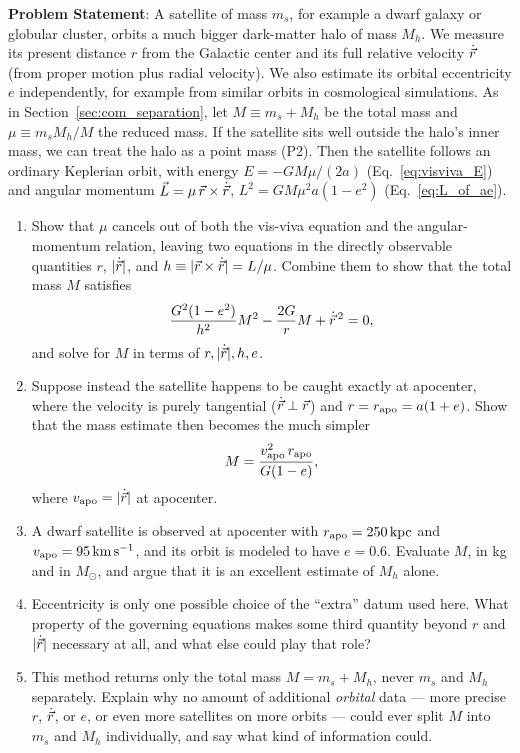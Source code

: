 \textbf{Problem Statement}: A satellite of mass $m_s$, for example a dwarf galaxy or globular cluster, orbits a much bigger dark-matter halo of mass $M_h$. We measure its present distance $r$ from the Galactic center and its full relative velocity $\dot{\vec r}$ (from proper motion plus radial velocity). We also estimate its orbital eccentricity $e$ independently, for example from similar orbits in cosmological simulations. As in Section~\ref{sec:com_separation}, let $M\equiv m_s+M_h$ be the total mass and $\mu\equiv m_sM_h/M$ the reduced mass. If the satellite sits well outside the halo's inner mass, we can treat the halo as a point mass (P2). Then the satellite follows an ordinary Keplerian orbit, with energy $E=-GM\mu/(2a)$ (Eq.~\eqref{eq:visviva_E}) and angular momentum $\vec L=\mu\,\vec r\times\dot{\vec r}$, $L^2=GM\mu^2a(1-e^2)$ (Eq.~\eqref{eq:L_of_ae}).
\begin{enumerate}[label=(\alph*)]
	\item Show that $\mu$ cancels out of both the vis-viva equation and the angular-momentum relation, leaving two equations in the directly observable quantities $r$, $|\dot{\vec r}|$, and $h\equiv|\vec r\times\dot{\vec r}|=L/\mu$. Combine them to show that the total mass $M$ satisfies
	\[
	\frac{G^2(1-e^2)}{h^2}M^2-\frac{2G}{r}M+\dot{\vec r}^{\,2}=0,
	\]
	and solve for $M$ in terms of $r,|\dot{\vec r}|,h,e$.
	\item Suppose instead the satellite happens to be caught exactly at apocenter, where the velocity is purely tangential ($\dot{\vec r}\perp\vec r$) and $r=r_{\rm apo}=a(1+e)$. Show that the mass estimate then becomes the much simpler
	\[
	M=\frac{v_{\rm apo}^2\,r_{\rm apo}}{G(1-e)},
	\]
	where $v_{\rm apo}=|\dot{\vec r}|$ at apocenter.
	\item A dwarf satellite is observed at apocenter with $r_{\rm apo}=250\,\mathrm{kpc}$ and $v_{\rm apo}=95\,\mathrm{km\,s^{-1}}$, and its orbit is modeled to have $e=0.6$. Evaluate $M$, in kg and in $M_\odot$, and argue that it is an excellent estimate of $M_h$ alone.
	\item Eccentricity is only one possible choice of the ``extra'' datum used here. What property of the governing equations makes some third quantity beyond $r$ and $|\dot{\vec r}|$ necessary at all, and what else could play that role?
	\item This method returns only the total mass $M=m_s+M_h$, never $m_s$ and $M_h$ separately. Explain why no amount of additional \emph{orbital} data --- more precise $r$, $\dot{\vec r}$, or $e$, or even more satellites on more orbits --- could ever split $M$ into $m_s$ and $M_h$ individually, and say what kind of information could.
\end{enumerate}

